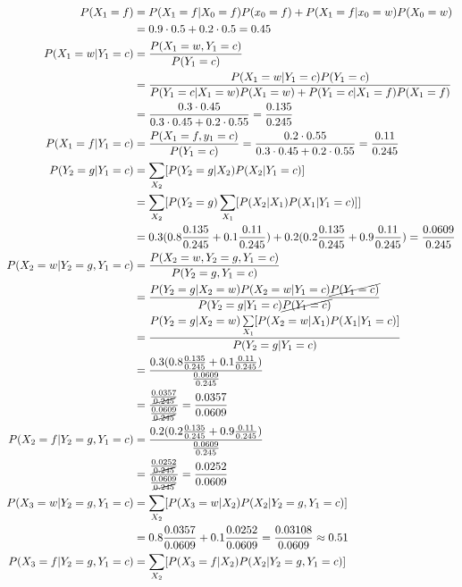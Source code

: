 \documentclass[a4paper,10pt]{article}
\begin{document}
\begin{enumerate}[~~(a)]
\begin{align*}
        P(X_1 = f) &= P(X_1 = f|X_0 = f) P(x_0 =f) + P(X_1 = f|x_0 = w) P(X_0 = w)\\
        &= 0.9 \cdot 0.5 + 0.2 \cdot 0.5 = 0.45\\
        P(X_1 = w|Y_1 = c) &= \frac{P(X_1 = w, Y_1 = c)}{P(Y_1 = c)}\\
        &= \frac{P(X_1 = w| Y_1 = c)P(Y_1 = c)}{P(Y_1 = c|X_1 = w)P(X_1 = w)+P(Y_1 = c|X_1 = f)P(X_1 = f)}\\
        &= \frac{0.3 \cdot 0.45}{0.3 \cdot 0.45 + 0.2 \cdot 0.55} = \frac{0.135}{0.245}\\
        P(X_1 = f|Y_1 = c) &= \frac{P(X_1 =f,y_1 = c)}{P(Y_1 = c)} = \frac{0.2 \cdot 0.55}{0.3 \cdot 0.45 + 0.2 \cdot 0.55} = \frac{0.11}{0.245}\\
        P(Y_2 = g|Y_1 = c) &= \sum\limits_{X_2} [P(Y_2 = g|X_2) P(X_2|Y_1 = c)]\\
        &= \sum\limits_{X_2} [P(Y_2 = g) \sum\limits_{X_1} [P(X_2|X_1)P(X_1|Y_1 = c)]]\\
        &= 0.3(0.8 \frac{0.135}{0.245} + 0.1 \frac{0.11}{0.245}) + 0.2(0.2 \frac{0.135}{0.245} + 0.9 \frac {0.11}{0.245}) = \frac{0.0609}{0.245}\\
        P(X_2 = w|Y_2 = g,Y_1 = c) &= \frac{P(X_2 = w, Y_2 = g, Y_1 = c)}{P(Y_2 = g, Y_1 = c)}\\
        &= \frac{P(Y_2 = g|X_2 = w) P(X_2 = w|Y_1 =c)\cancel{P(Y_1 = c)}}{P(Y_2 = g|Y_1 = c)\cancel{P(Y_1 = c)}}\\
        &= \frac{P(Y_2 = g|X_2 = w) \sum\limits_{X_1} [P(X_2 = w|X_1)P(X_1|Y_1 = c)]}{P(Y_2 = g|Y_1 = c)}\\
        &= \frac{0.3(0.8 \frac{0.135}{0.245} + 0.1 \frac{0.11}{0.245})}{\frac{0.0609}{0.245}}\\
        &= \frac{\frac{0.0357}{\cancel{0.245}}}{\frac{0.0609}{\cancel{0.245}}} = \frac{0.0357}{0.0609}\\
        P(X_2 = f|Y_2 = g,Y_1 = c) &=\frac{0.2(0.2 \frac{0.135}{0.245} + 0.9 \frac {0.11}{0.245})}{\frac{0.0609}{0.245}}\\
        &=\frac{\frac{0.0252}{\cancel{0.245}}}{\frac{0.0609}{\cancel{0.245}}} = \frac{0.0252}{0.0609}\\
        P(X_3 = w| Y_2 = g, Y_1 = c) &= \sum\limits_{X_2} [P(X_3 = w|X_2) P(X_2|Y_2 = g, Y_1 = c)]\\
        &= 0.8 \frac{0.0357}{0.0609} + 0.1 \frac{0.0252}{0.0609} = \frac{0.03108}{0.0609} \approx 0.51\\
        P(X_3 = f| Y_2 = g, Y_1 = c) &= \sum\limits_{X_2} [P(X_3 = f|X_2) P(X_2|Y_2 = g, Y_1 = c)]\\

\end{align*}
\end{enumerate}
\end{document}
